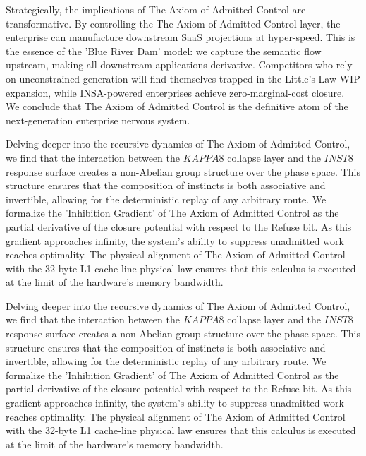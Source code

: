 \documentclass[12pt,a4paper,oneside]{book}
\begin{document}
Strategically, the implications of The Axiom of Admitted Control are transformative. By controlling the The Axiom of Admitted Control layer, the enterprise can manufacture downstream SaaS projections at hyper-speed. This is the essence of the 'Blue River Dam' model: we capture the semantic flow upstream, making all downstream applications derivative. Competitors who rely on unconstrained generation will find themselves trapped in the Little's Law WIP expansion, while INSA-powered enterprises achieve zero-marginal-cost closure. We conclude that The Axiom of Admitted Control is the definitive atom of the next-generation enterprise nervous system. 

Delving deeper into the recursive dynamics of The Axiom of Admitted Control, we find that the interaction between the $KAPPA8$ collapse layer and the $INST8$ response surface creates a non-Abelian group structure over the phase space. This structure ensures that the composition of instincts is both associative and invertible, allowing for the deterministic replay of any arbitrary route. We formalize the 'Inhibition Gradient' of The Axiom of Admitted Control as the partial derivative of the closure potential with respect to the Refuse bit. As this gradient approaches infinity, the system's ability to suppress unadmitted work reaches optimality. The physical alignment of The Axiom of Admitted Control with the 32-byte L1 cache-line physical law ensures that this calculus is executed at the limit of the hardware's memory bandwidth. 

Delving deeper into the recursive dynamics of The Axiom of Admitted Control, we find that the interaction between the $KAPPA8$ collapse layer and the $INST8$ response surface creates a non-Abelian group structure over the phase space. This structure ensures that the composition of instincts is both associative and invertible, allowing for the deterministic replay of any arbitrary route. We formalize the 'Inhibition Gradient' of The Axiom of Admitted Control as the partial derivative of the closure potential with respect to the Refuse bit. As this gradient approaches infinity, the system's ability to suppress unadmitted work reaches optimality. The physical alignment of The Axiom of Admitted Control with the 32-byte L1 cache-line physical law ensures that this calculus is executed at the limit of the hardware's memory bandwidth. 
\end{document}
